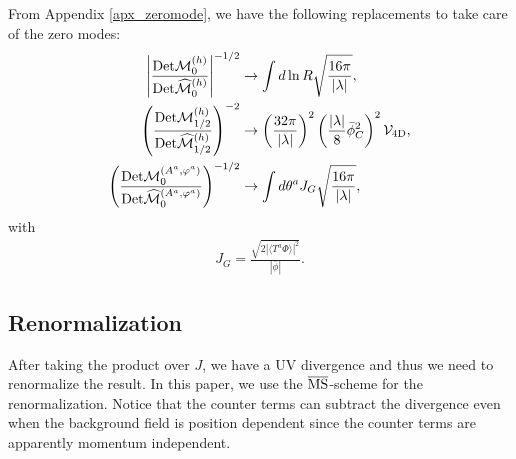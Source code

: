 \documentclass[12pt]{article}
\begin{document}
From Appendix \ref{apx_zeromode}, we have the following replacements
to take care of the zero modes:
\begin{align}
  \left|
    \frac{\det \mathcal M^{(h)}_0}{\det \widehat{\mathcal M}^{(h)}_0}
  \right|^{-1/2}
  & \to\int d \ln R
  \sqrt{\frac{16\pi}{|\lambda|}},
  \label{eq_dilatationalZeromode}                                           \\
  \left(
    \frac{\det \mathcal M^{(h)}_{1/2}}{\det \widehat{\mathcal M}^{(h)}_{1/2}}
  \right)^{-2}
  & \to \left(
    \frac{32\pi}{|\lambda|}\right)^2\left(\frac{|\lambda|}{8}\bar\phi_C^2
  \right)^2
  {\mathcal V}_{\rm 4D},
  \\
  \left(
    \frac{\det \mathcal M^{(A^a,\varphi^a)}_0}
    {\det \widehat{\mathcal M}^{(A^a,\varphi^a)}_0}
  \right)^{-1/2}
  & \to \int d\theta^aJ_G\sqrt{\frac{16\pi}{|\lambda|}},
\end{align}
with
\begin{align}
  J_G = \frac{\sqrt{2|\langle T^a\Phi\rangle|^2}}{|\bar\phi|}.
\end{align}





\subsection{Renormalization}

After taking the product over $J$, we have a UV divergence and thus we
need to renormalize the result.  In this paper, we use the
$\msbar$-scheme for the renormalization. Notice that the counter terms
can subtract the divergence even when the background field is position
dependent since the counter terms are apparently momentum independent.

\end{document}
